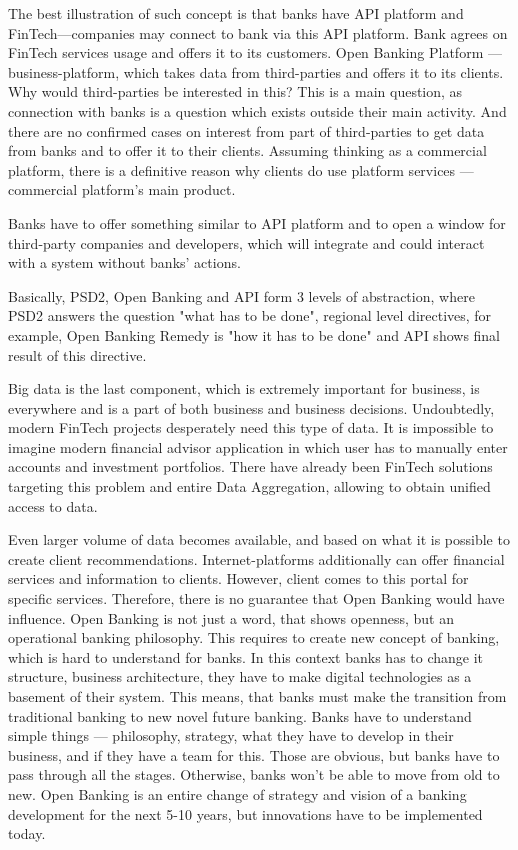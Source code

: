 The best illustration of such concept is that banks have API platform and FinTech—companies may connect to bank via this API platform.
Bank agrees on FinTech services usage and offers it to its customers.
Open Banking Platform — business-platform, which takes data from third-parties and offers it to its clients. Why would third-parties be interested in this?
This is a main question, as connection with banks is a question which exists outside their main activity.
And there are no confirmed cases on interest from part of third-parties to get data from banks and to offer it to their clients.
Assuming thinking as a commercial platform, there is a definitive reason why clients do use platform services — commercial platform's main product. 

Banks have to offer something similar to API platform and to open a window for third-party companies and developers, which will integrate and could interact with a system without banks' actions.

Basically, PSD2, Open Banking and API form 3 levels of abstraction, where PSD2 answers the question "what has to be done", regional level directives, for example, Open Banking Remedy is "how it has to be done" and API shows final result of this directive.

Big data is the last component, which is extremely important for business, is everywhere and is a part of both business and business decisions.
Undoubtedly, modern FinTech projects desperately need this type of data. 
It is impossible to imagine modern financial advisor application in which user has to manually enter accounts and investment portfolios. 
There have already been FinTech solutions targeting this problem and entire Data Aggregation, allowing to obtain unified access to data. 

Even larger volume of data becomes available, and based on what it is possible to create client recommendations.
Internet-platforms additionally can offer financial services and information to clients.
However, client comes to this portal for specific services.
Therefore, there is no guarantee that Open Banking would have influence.
Open Banking is not just a word, that shows openness, but an operational banking philosophy.
This requires to create new concept of banking, which is hard to understand for banks.
In this context banks has to change it structure, business architecture, they have to make digital technologies as a basement of their system.
This means, that banks must make the transition from traditional banking to new novel future banking.
Banks have to understand simple things — philosophy, strategy, what they have to develop in their business, and if they have a team for this.
Those are obvious, but banks have to pass through all the stages. 
Otherwise, banks won't be able to move from old to new.
Open Banking is an entire change of strategy and vision of a banking development for the next 5-10 years, but innovations have to be implemented today.


